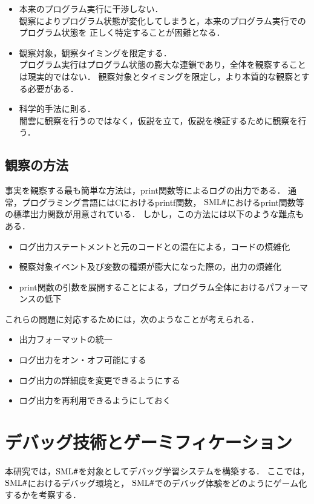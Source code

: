 \documentclass{jreport}
\newcommand\SMLSharp{$\mbox{SML\fontfamily{ptm}\selectfont\#}$}
\begin{document}
\begin{itemize}
  \item 本来のプログラム実行に干渉しない． \\
  観察によりプログラム状態が変化してしまうと，本来のプログラム実行でのプログラム状態を
  正しく特定することが困難となる．
  \item 観察対象，観察タイミングを限定する． \\
  プログラム実行はプログラム状態の膨大な連鎖であり，全体を観察することは現実的ではない．
  観察対象とタイミングを限定し，より本質的な観察とする必要がある．
  \item 科学的手法に則る． \\
  闇雲に観察を行うのではなく，仮説を立て，仮説を検証するために観察を行う．
\end{itemize}

\subsection{観察の方法}
事実を観察する最も簡単な方法は，print関数等によるログの出力である．
通常，プログラミング言語にはCにおけるprintf関数，
\SMLSharp{}におけるprint関数等の標準出力関数が用意されている．
しかし，この方法には以下のような難点もある．

\begin{itemize}
  \item ログ出力ステートメントと元のコードとの混在による，コードの煩雑化
  \item 観察対象イベント及び変数の種類が膨大になった際の，出力の煩雑化
  \item print関数の引数を展開することによる，プログラム全体におけるパフォーマンスの低下
\end{itemize}

これらの問題に対応するためには，次のようなことが考えられる．

\begin{itemize}
  \item 出力フォーマットの統一
  \item ログ出力をオン・オフ可能にする
  \item ログ出力の詳細度を変更できるようにする
  \item ログ出力を再利用できるようにしておく
\end{itemize}

\section{デバッグ技術とゲーミフィケーション}
本研究では，\SMLSharp を対象としてデバッグ学習システムを構築する．
ここでは，\SMLSharp におけるデバッグ環境と，
\SMLSharp でのデバッグ体験をどのようにゲーム化するかを考察する．
\end{document}
